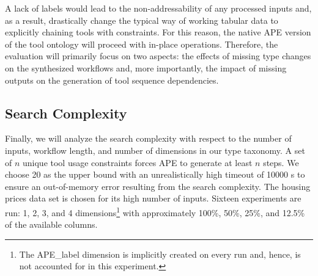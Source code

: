 A lack of labels would lead to the non-addressability of any processed inputs and, as a result, drastically change the typical way of working tabular data to explicitly chaining tools with constraints. For this reason, the native APE version of the tool ontology will proceed with in-place operations. Therefore, the evaluation will primarily focus on two aspects: the effects of missing type changes on the synthesized workflows and, more importantly, the impact of missing outputs on the generation of tool sequence dependencies.

\subsection{Search Complexity}
Finally, we will analyze the search complexity with respect to the number of inputs, workflow length, and number of dimensions in our type taxonomy. A set of \(n\) unique tool usage constraints forces APE to generate at least \(n\) steps. We choose 20 as the upper bound with an unrealistically high timeout of 10000 s to ensure an out-of-memory error resulting from the search complexity. The housing prices data set is chosen for its high number of inputs. Sixteen experiments are run: 1, 2, 3, and 4 dimensions\footnote{The APE\_label dimension is implicitly created on every run and, hence, is not accounted for in this experiment.} with approximately 100\%, 50\%, 25\%, and 12.5\% of the available columns.

